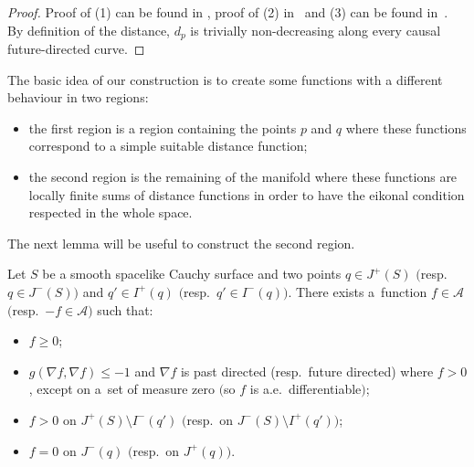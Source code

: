 \documentclass[pdftex]{sigma}
\begin{document}
\begin{proof}
Proof of (1) can be found in \cite{Beem,ONeill}, proof of (2) in~\cite{EGK} and (3) can be found in~\cite{Mor}. By def\/inition of the distance, $d_p$ is trivially non-decreasing along every causal future-directed curve.
\end{proof}

The basic idea of our construction is to create some functions with a dif\/ferent behaviour in two regions:
\begin{itemize}\itemsep=0pt
\item the f\/irst region is a region containing the points $p$ and $q$ where these functions correspond to a simple suitable distance function;
\item the second region is the remaining of the manifold where these functions are locally f\/inite sums of distance functions in order to have the eikonal condition respected in the whole space.
\end{itemize}

The next lemma will be useful to construct the second region.

\begin{lemma}\label{lemmaprincipal}
Let $S$ be a smooth spacelike Cauchy surface and two points $q \in J^+(S)$ $($resp.\ $q \in J^-(S))$ and $q' \in I^+(q)$ $($resp.\ $q' \in I^-(q))$. There exists a~function $f \in \mathcal A$ $($resp.\ $-f \in \mathcal A)$ such that:
\begin{itemize}\itemsep=0pt
\item $f \geq 0 $;
\item $g( \nabla f, \nabla f ) \leq -1$ and $\nabla f$ is past directed (resp.\ future directed) where $f > 0$, except on a~set of measure zero $($so $f$ is a.e.\ differentiable$)$;
\item $f > 0$ on $J^+(S) \setminus I^-(q')$ $($resp.\ on $J^-(S) \setminus I^+(q'))$;
\item $f = 0$ on $J^-(q)$ $($resp.\ on $J^+(q))$.
\end{itemize}
\end{lemma}
\end{document}
